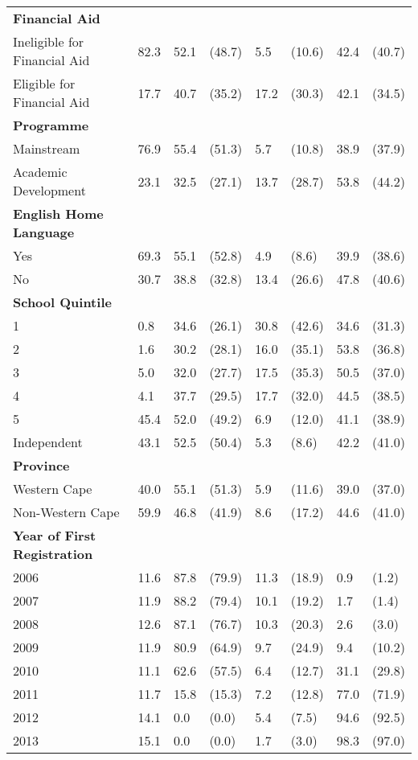 \begin{longtable}{L{2.5cm}C{2.5cm}C{1cm}C{1.5cm}C{1cm}C{1.5cm}C{1cm}C{1.5cm}}
\bfseries Financial Aid \\
Ineligible for Financial Aid & 82.3 & 52.1 & (48.7) & 5.5 & (10.6) & 42.4 & (40.7) \\
Eligible for Financial Aid & 17.7 & 40.7 & (35.2) & 17.2 & (30.3) & 42.1 & (34.5) \\
\addlinespace
\bfseries Programme \\
Mainstream & 76.9 & 55.4 & (51.3) & 5.7 & (10.8) & 38.9 & (37.9) \\
Academic Development & 23.1 & 32.5 & (27.1) & 13.7 & (28.7) & 53.8 & (44.2) \\
\addlinespace
\bfseries English Home Language \\
Yes & 69.3 & 55.1 & (52.8) & 4.9 & (8.6) & 39.9 & (38.6) \\
No & 30.7 & 38.8 & (32.8) & 13.4 & (26.6) & 47.8 & (40.6) \\
\addlinespace
\bfseries School Quintile \\
1 & 0.8 & 34.6 & (26.1) & 30.8 & (42.6) & 34.6 & (31.3) \\
2 & 1.6 & 30.2 & (28.1) & 16.0 & (35.1) & 53.8 & (36.8) \\
3 & 5.0 & 32.0 & (27.7) & 17.5 & (35.3) & 50.5 & (37.0) \\
4 & 4.1 & 37.7 & (29.5) & 17.7 & (32.0) & 44.5 & (38.5) \\
5 & 45.4 & 52.0 & (49.2) & 6.9 & (12.0) & 41.1 & (38.9) \\
Independent  & 43.1 & 52.5 & (50.4) & 5.3 & (8.6) & 42.2 & (41.0) \\
\addlinespace
{\bfseries Province} \\
Western Cape & 40.0 & 55.1 & (51.3) &5.9 & (11.6) &39.0 & (37.0) \\
Non-Western Cape & 59.9 & 46.8 & (41.9) & 8.6 & (17.2) & 44.6 & (41.0) \\
\addlinespace
{\bfseries Year of First Registration} \\
{2006} & 11.6  & 87.8 & (79.9) & 11.3 & (18.9) & 0.9 & (1.2) \\
{2007} & 11.9 & 88.2 & (79.4) & 10.1 & (19.2)   & 1.7 & (1.4) \\
{2008} & 12.6 & 87.1 & (76.7) & 10.3 & (20.3) & 2.6 & (3.0) \\
{2009} & 11.9 & 80.9 & (64.9) & 9.7 & (24.9) & 9.4 & (10.2) \\
{2010} & 11.1 & 62.6 & (57.5) & 6.4 & (12.7) & 31.1 & (29.8) \\
{2011} & 11.7 & 15.8 & (15.3) & 7.2 & (12.8) & 77.0 & (71.9) \\
{2012} & 14.1 & 0.0 & (0.0)  & 5.4 & (7.5) & 94.6 & (92.5) \\
{2013} & 15.1 & 0.0 & (0.0) & 1.7 & (3.0) & 98.3 & (97.0) \\
\end{longtable}

